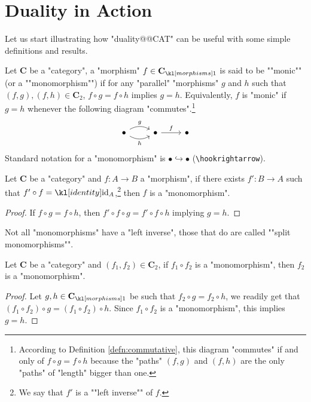 \documentclass[main.tex]{subfiles}
\begin{document}
\section{Duality in Action}
Let us start illustrating how "duality@@CAT" can be useful with some simple definitions and results.
\begin{defn}[Monomorphism]
	\AP Let $\mathbf{C}$ be a "category", a "morphism" $f \in \mor{\mathbf{C}}$ is said to be ""monic"" (or a ""monomorphism"") if for any "parallel" "morphisms" $g$ and $h$ such that $(f,g), (f,h) \in \mathbf{C}_2$, $f\circ g = f\circ h$ implies $g = h$. Equivalently, $f$ is "monic" if $g = h$ whenever the following diagram "commutes".\footnote{According to Definition \ref{defn:commutative}, this diagram "commutes" if and only of $f \circ g = f \circ h$ because the "paths" $(f,g)$ and $(f,h)$ are the only "paths" of "length" bigger than one.}
	\begin{equation}\label{diag:defmonic}
		\begin{tikzcd}
		\bullet \arrow[r, "h"', bend right] \arrow[r, "g", bend left] & \bullet \arrow[r, "f"] & \bullet
		\end{tikzcd}
	\end{equation}
	Standard notation for a "monomorphism" is $ \bullet \hookrightarrow \bullet $ (\verb!\hookrightarrow!).
\end{defn}
\begin{prop}\label{prop:mon1}
	Let $\mathbf{C}$ be a "category" and $f:A\rightarrow B$ a "morphism", if there exists $f': B\rightarrow A$ such that $f'\circ f = \id_A$,\footnote{\AP We say that $f'$ is a ""left inverse"" of $f$.} then $f$ is a "monomorphism".
\end{prop}
\begin{proof}
	If $f\circ g = f\circ h$, then $f'\circ f \circ g = f'\circ f \circ h$ implying $g = h$.
\end{proof}
\AP Not all "monomorphisms" have a "left inverse", those that do are called ""split monomorphisms"".
\begin{prop}\label{prop:mon2}
	Let $\mathbf{C}$ be a "category" and $(f_1, f_2) \in \mathbf{C}_2$, if $f_1 \circ f_2$ is a "monomorphism", then $f_2$ is a "monomorphism".
\end{prop}
\begin{proof}
	Let $g,h \in \mor{\mathbf{C}}$ be such that $f_2\circ g = f_2\circ h$, we readily get that $(f_1\circ f_2)\circ g = (f_1 \circ f_2) \circ h$. Since $f_1\circ f_2$ is a "monomorphism", this implies $g = h$.
\end{proof}
\end{document}
